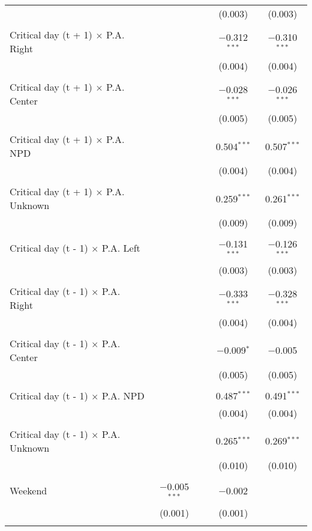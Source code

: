 \documentclass[
]{article}
\begin{document}
\begin{table}[!htbp]
{\begin{tabular}{@{\extracolsep{5pt}}lcccc}
  &  &  & (0.003) & (0.003) \\ 
  & & & & \\ 
 Critical day (t + 1) $\times$ P.A. Right &  &  & $-$0.312$^{***}$ & $-$0.310$^{***}$ \\ 
  &  &  & (0.004) & (0.004) \\ 
  & & & & \\ 
 Critical day (t + 1) $\times$ P.A. Center &  &  & $-$0.028$^{***}$ & $-$0.026$^{***}$ \\ 
  &  &  & (0.005) & (0.005) \\ 
  & & & & \\ 
 Critical day (t + 1) $\times$ P.A. NPD &  &  & 0.504$^{***}$ & 0.507$^{***}$ \\ 
  &  &  & (0.004) & (0.004) \\ 
  & & & & \\ 
 Critical day (t + 1) $\times$ P.A. Unknown &  &  & 0.259$^{***}$ & 0.261$^{***}$ \\ 
  &  &  & (0.009) & (0.009) \\ 
  & & & & \\ 
 Critical day (t - 1) $\times$ P.A. Left &  &  & $-$0.131$^{***}$ & $-$0.126$^{***}$ \\ 
  &  &  & (0.003) & (0.003) \\ 
  & & & & \\ 
 Critical day (t - 1) $\times$ P.A. Right &  &  & $-$0.333$^{***}$ & $-$0.328$^{***}$ \\ 
  &  &  & (0.004) & (0.004) \\ 
  & & & & \\ 
 Critical day (t - 1) $\times$ P.A. Center &  &  & $-$0.009$^{*}$ & $-$0.005 \\ 
  &  &  & (0.005) & (0.005) \\ 
  & & & & \\ 
 Critical day (t - 1) $\times$ P.A. NPD &  &  & 0.487$^{***}$ & 0.491$^{***}$ \\ 
  &  &  & (0.004) & (0.004) \\ 
  & & & & \\ 
 Critical day (t - 1) $\times$ P.A. Unknown &  &  & 0.265$^{***}$ & 0.269$^{***}$ \\ 
  &  &  & (0.010) & (0.010) \\ 
  & & & & \\ 
 Weekend & $-$0.005$^{***}$ &  & $-$0.002 &  \\ 
  & (0.001) &  & (0.001) &  \\ 
  & & & & \\ 

\end{tabular}}
\end{table}
\end{document}
